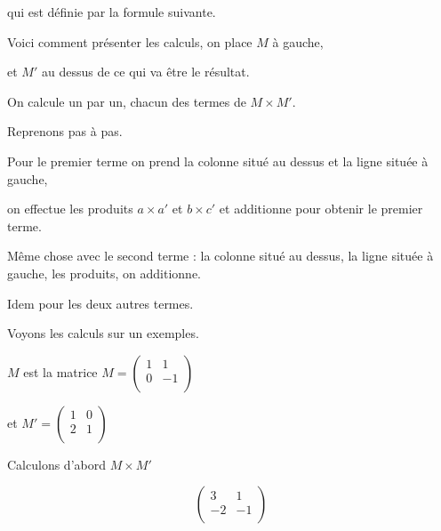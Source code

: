 \change

qui est définie par la formule suivante.

\change

Voici comment présenter les calculs, on place $M$ à gauche,

\change

et $M'$ au dessus de ce qui va être le résultat.

\change

On calcule un par un, chacun des termes de $M \times M'$.

\change

Reprenons pas à pas.


Pour le premier terme on prend la colonne situé au dessus et la ligne
située à gauche, 

\change

\change

\change

on effectue les produits $a\times a'$ et $b\times c'$ et additionne
pour obtenir le premier terme.

\change

Même chose avec le second terme : la colonne situé au dessus, la ligne
située à gauche, les produits, on additionne.

\change

Idem pour les deux autres termes.

\change


\diapo

Voyons les calculs sur un exemples.

$M$ est la matrice $M=\left(\begin{matrix} 1 & 1 \\ 0 & -1 \\ \end{matrix}\right)$

et $M' = \left(\begin{matrix} 1 & 0 \\ 2 & 1 \\ \end{matrix}\right)$

\change

Calculons d'abord $M \times M'$

\change

$$\left(\begin{matrix} 3 & 1 \\ -2 & -1 \\ \end{matrix}\right)$$

